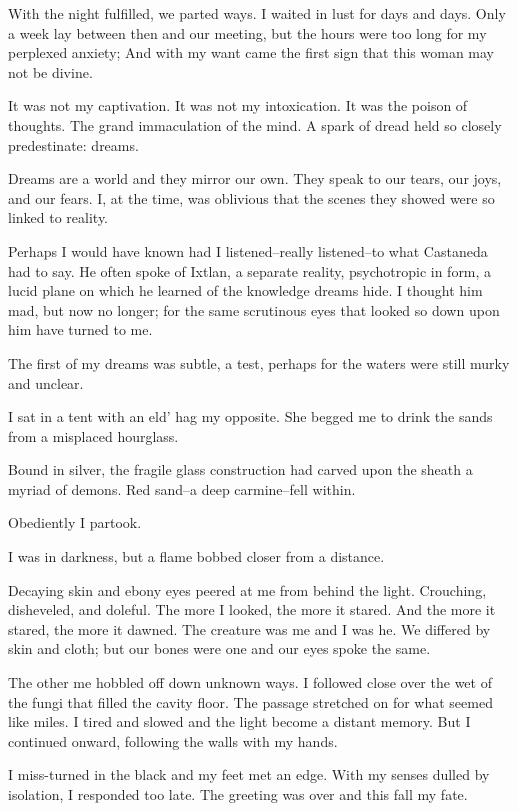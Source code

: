 \documentclass{article}
\begin{document}
With the night fulfilled, we parted ways.
I waited in lust for days and days.
Only a week lay between then and our meeting,
but the hours were too long for my perplexed anxiety;
And with my want came the first sign that this woman may not be divine.


It was not my captivation.
It was not my intoxication.
It was the poison of thoughts.
The grand immaculation of the mind.
A spark of dread held so closely predestinate: dreams.
\VV


\noindent
Dreams are a world and they mirror our own.
They speak to our tears, our joys, and our fears.
I, at the time, was oblivious that the scenes they
showed were so linked to reality.


Perhaps I would have known had I listened--really listened--to
what Castaneda had to say.
He often spoke of Ixtlan,
a separate reality,
psychotropic in form,
a lucid plane on which he learned of the knowledge dreams hide.
I thought him mad, but now no longer;
for the same scrutinous eyes that looked so down upon him
have turned to me.
\VV


\noindent
The first of my dreams was subtle, a test, perhaps
for the waters were still murky and unclear.
\VV


\noindent
I sat in a tent with an eld' hag my opposite.
She begged me to drink the sands from a misplaced hourglass.


Bound in silver, the fragile glass construction had
carved upon the sheath a myriad of demons.
Red sand--a deep carmine--fell within.


Obediently I partook.


\noindent
I was in darkness, but a flame bobbed closer from a distance.


Decaying skin and ebony eyes peered at me from behind the light.
Crouching, disheveled, and doleful.
The more I looked, the more it stared.
And the more it stared, the more it dawned.
The creature was me and I was he.
We differed by skin and cloth; but our bones were one
and our eyes spoke the same.


The other me hobbled off down unknown ways.
I followed close over the wet of the fungi that
filled the cavity floor.
The passage stretched on for what seemed like miles.
I tired and slowed and the light become a distant memory.
But I continued onward, following the walls with my hands.


I miss-turned in the black and my feet met an edge.
With my senses dulled by isolation, I responded too late.
The greeting was over and this fall my fate.
\VV
\end{document}
